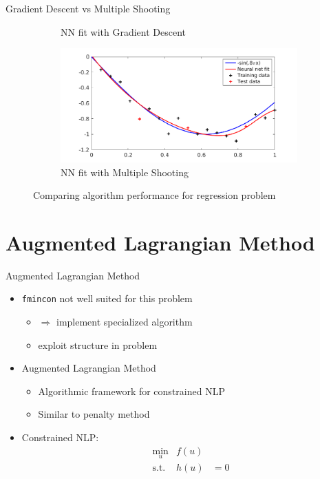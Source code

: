 \documentclass[11pt,t]{beamer}
\begin{document}
\begin{frame}[fragile]{Gradient Descent vs Multiple Shooting}
\begin{figure}
\begin{subfigure}[b]{0.49\textwidth}
         \caption*{\footnotesize NN fit with Gradient Descent}
         \label{gdfit}
     \end{subfigure}
     \begin{subfigure}[b]{0.49\textwidth}
         \centering
         \includegraphics[width=\textwidth]{fminfit}
         \caption*{\footnotesize NN fit with Multiple Shooting}
         \label{fminfit}
     \end{subfigure}
    \caption*{Comparing algorithm performance for regression problem}
    \label{compalg}
\end{figure}
\end{frame}

\section{Augmented Lagrangian Method}

\begin{frame}[fragile]{Augmented Lagrangian Method}
\begin{itemize}
	\item \texttt{fmincon} not well suited for this problem
	\begin{itemize}
		\item $\Rightarrow$ implement specialized algorithm
		\item exploit structure in problem
	\end{itemize}
	\item Augmented Lagrangian Method
	\begin{itemize}
		\item Algorithmic framework for constrained NLP
		\item Similar to penalty method
	\end{itemize}
	\item Constrained NLP:
	\begin{equation*}
		\begin{aligned}
		& \underset{u}{\text{min}} & f(u) & \\
		& \text{s.t.} & h(u) &= 0 \\
		\end{aligned}
	\end{equation*}
\end{itemize}
\end{frame}
\end{document}
